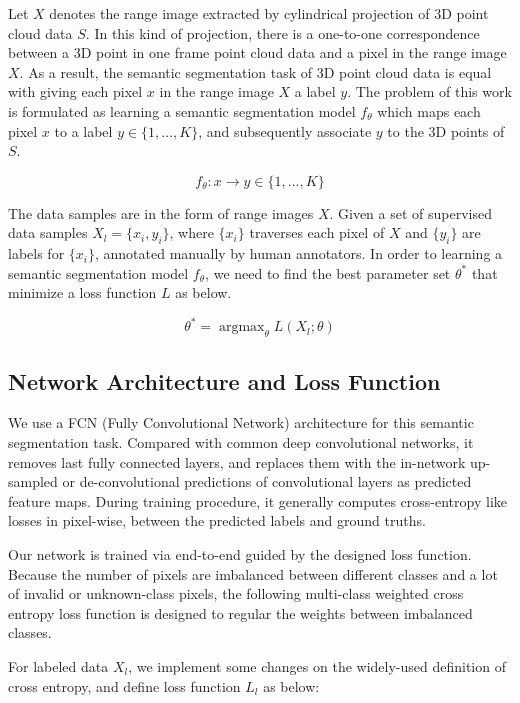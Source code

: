 	Let $X$ denotes the range image extracted by cylindrical projection of 3D point cloud data $S$. In this kind of projection, there is a one-to-one correspondence between a 3D point in one frame point cloud data and a pixel in the range image $X$. As a result, the semantic segmentation task of 3D point cloud data is equal with giving each pixel $x$ in the range image $X$ a label $y$. The problem of this work is formulated as learning a semantic segmentation model $f_{\theta}$ which maps each pixel $x$ to a label $y\in\{1,...,K\}$, and subsequently associate $y$ to the 3D points of $S$.
	
	\begin{equation}
	f_{\theta}: x\to y \in \{1,...,K\}
	\end{equation}
	
	The data samples are in the form of range images $X$. Given a set of supervised data samples $X_l=\{x_i, y_i\}$, where $\{x_i\}$ traverses each pixel of $X$ and $\{y_i\}$ are labels for $\{x_i\}$, annotated manually by human annotators. 
	In order to learning a semantic segmentation model $f_\theta$, we need to find the best parameter set $\theta^*$ that minimize a loss function $L$ as below.
	
	\begin{equation}
	\theta^{*}=\mathop{\arg\max}_{\theta}L(X_l; \theta)
	\end{equation}
	
	\subsection{Network Architecture and Loss Function}
	We use a FCN (Fully Convolutional Network) architecture for this semantic segmentation task.
	Compared with common deep convolutional networks, it removes last fully connected layers, and replaces them with the in-network up-sampled or de-convolutional predictions of convolutional layers as predicted feature maps. During training procedure, it generally computes cross-entropy like losses in pixel-wise, between the predicted labels and ground truths.
	
	Our network is trained via end-to-end guided by the designed loss function. Because the number of pixels are imbalanced between different classes and a lot of invalid or unknown-class pixels, the following multi-class weighted cross entropy loss function is designed to regular the weights between imbalanced classes.
	
	For labeled data $X_l$, we implement some changes on the widely-used definition of cross entropy, and define loss function $L_l$ as below:
	
